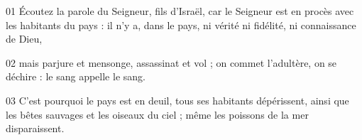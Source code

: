 01 Écoutez la parole du Seigneur, fils d’Israël, car le Seigneur est en procès avec les habitants du pays : il n’y a, dans le pays, ni vérité ni fidélité, ni connaissance de Dieu,

02 mais parjure et mensonge, assassinat et vol ; on commet l’adultère, on se déchire : le sang appelle le sang.

03 C’est pourquoi le pays est en deuil, tous ses habitants dépérissent, ainsi que les bêtes sauvages et les oiseaux du ciel ; même les poissons de la mer disparaissent.
